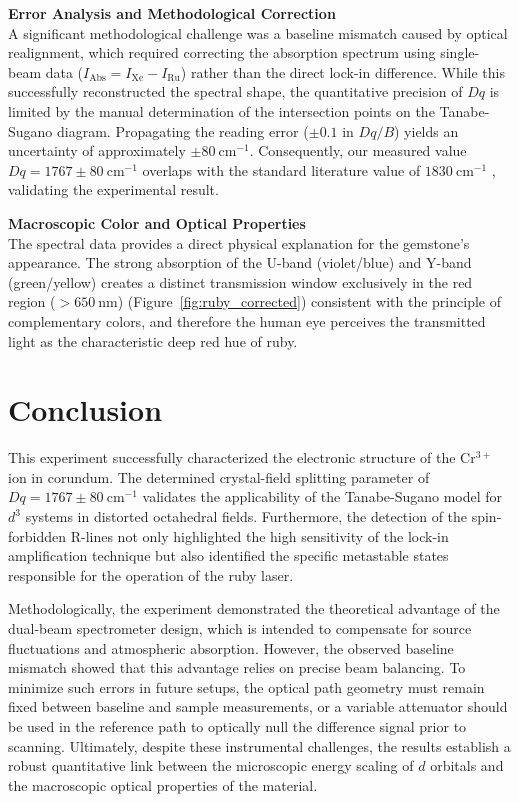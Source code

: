 \documentclass[a4paper]{article}
\begin{document}
\textbf{Error Analysis and Methodological Correction} \\
A significant methodological challenge was a baseline mismatch caused by optical realignment, which required correcting the absorption spectrum using single-beam data (\(I_{\mathrm{Abs}} = I_{\mathrm{Xe}} - I_{\mathrm{Ru}}\)) rather than the direct lock-in difference. While this successfully reconstructed the spectral shape, the quantitative precision of \(Dq\) is limited by the manual determination of the intersection points on the Tanabe-Sugano diagram. Propagating the reading error ($\pm 0.1$ in $Dq/B$) yields an uncertainty of approximately \(\pm 80\ \mathrm{cm^{-1}}\). Consequently, our measured value \(Dq = 1767 \pm 80\ \mathrm{cm^{-1}}\) overlaps with the standard literature value of \(1830\ \mathrm{cm^{-1}}\) \cite{Reddy1982}, validating the experimental result.

\textbf{Macroscopic Color and Optical Properties} \\
The spectral data provides a direct physical explanation for the gemstone's appearance. The strong absorption of the U-band (violet/blue) and Y-band (green/yellow) creates a distinct transmission window exclusively in the red region (\(>650\ \mathrm{nm}\)) (Figure~\ref{fig:ruby_corrected}) consistent with the principle of complementary colors, and therefore the human eye perceives the transmitted light as the characteristic deep red hue of ruby.

\section{Conclusion}

This experiment successfully characterized the electronic structure of the Cr\(^{3+}\) ion in corundum. The determined crystal-field splitting parameter of \(Dq = 1767 \pm 80\ \mathrm{cm^{-1}}\) validates the applicability of the Tanabe-Sugano model for \(d^3\) systems in distorted octahedral fields. Furthermore, the detection of the spin-forbidden R-lines not only highlighted the high sensitivity of the lock-in amplification technique but also identified the specific metastable states responsible for the operation of the ruby laser.

Methodologically, the experiment demonstrated the theoretical advantage of the dual-beam spectrometer design, which is intended to compensate for source fluctuations and atmospheric absorption. However, the observed baseline mismatch showed that this advantage relies on precise beam balancing. To minimize such errors in future setups, the optical path geometry must remain fixed between baseline and sample measurements, or a variable attenuator should be used in the reference path to optically null the difference signal prior to scanning. Ultimately, despite these instrumental challenges, the results establish a robust quantitative link between the microscopic energy scaling of \(d\) orbitals and the macroscopic optical properties of the material.
\end{document}
